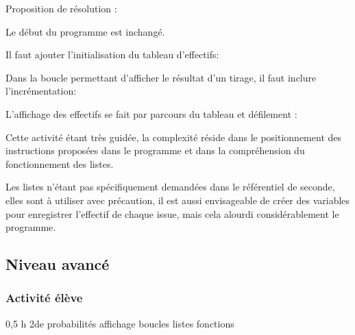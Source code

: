 %
%
\begin{methode}
Proposition de résolution :

Le début du programme est inchangé.


Il faut ajouter l'initialisation du tableau d'effectifs:

Dans la boucle permettant d'afficher le résultat d'un tirage, il faut inclure l'incrémentation:


L'affichage des effectifs se fait par parcours du tableau et défilement :

\end{methode}


\begin{remarque}
   Cette activité étant très guidée, la complexité réside dans le positionnement des instructions proposées dans le programme et dans la compréhension du fonctionnement des listes.
   
   Les listes n'étant pas spécifiquement demandées dans le référentiel de seconde, elles sont à utiliser avec précaution, il est aussi envisageable de créer des variables pour enregistrer l'effectif de chaque issue, mais cela alourdi considérablement le programme.
\end{remarque}



%
%

\newpage

\subsection{Niveau avancé}

\subsubsection{Activité élève}

\cartouche
{0,5 h}         %
{2de}           %
{probabilités}        %
{}     %
{affichage boucles listes fonctions}       %


